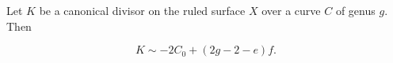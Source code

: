 Let $K$ be a canonical divisor on the ruled surface $X$ over a curve $C$ of genus $g$. Then

$$K \sim -2C_0 + (2g - 2 - e)f.$$
